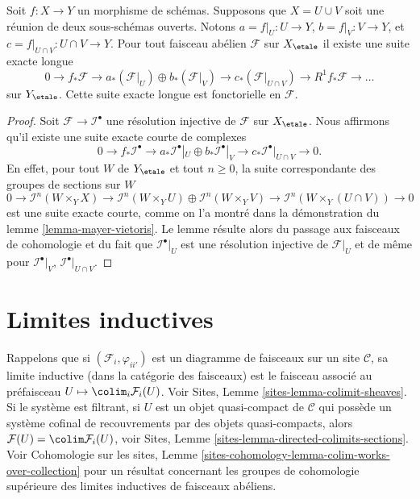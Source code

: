 \begin{lemma}
\label{lemma-relative-mayer-vietoris}
Soit $f : X \to Y$ un morphisme de sch\'emas. Supposons que $X = U \cup V$
soit une r\'eunion de deux sous-sch\'emas ouverts. Notons
$a = f|_U : U \to Y$, $b = f|_V : V \to Y$, et
$c = f|_{U \cap V} : U \cap V \to Y$.
Pour tout faisceau ab\'elien $\mathcal{F}$ sur $X_\etale$
il existe une suite exacte longue
$$
0 \to
f_*\mathcal{F} \to
a_*(\mathcal{F}|_U) \oplus b_*(\mathcal{F}|_V) \to
c_*(\mathcal{F}|_{U \cap V}) \to
R^1f_*\mathcal{F} \to \ldots
$$
sur $Y_\etale$.
Cette suite exacte longue est fonctorielle en $\mathcal{F}$.
\end{lemma}

\begin{proof}
Soit $\mathcal{F} \to \mathcal{I}^\bullet$ une r\'esolution injective
de $\mathcal{F}$ sur $X_\etale$. Nous affirmons qu'il existe
une suite exacte courte de complexes
$$
0 \to
f_*\mathcal{I}^\bullet \to
a_*\mathcal{I}^\bullet|_U \oplus b_*\mathcal{I}^\bullet|_V \to
c_*\mathcal{I}^\bullet|_{U \cap V} \to
0.
$$
En effet, pour tout $W$ de $Y_\etale$ et tout $n \geq 0$, la
suite correspondante des groupes de sections sur $W$
$$
0 \to
\mathcal{I}^n(W \times_Y X) \to
\mathcal{I}^n(W \times_Y U)
\oplus \mathcal{I}^n(W \times_Y V) \to
\mathcal{I}^n(W \times_Y (U \cap V)) \to
0
$$
est une suite exacte courte, comme on l'a montr\'e dans la d\'emonstration du lemme \ref{lemma-mayer-vietoris}.
Le lemme r\'esulte alors du passage aux faisceaux de cohomologie et du fait que
$\mathcal{I}^\bullet|_U$ est une r\'esolution injective de $\mathcal{F}|_U$
et de m\^eme pour $\mathcal{I}^\bullet|_V$, $\mathcal{I}^\bullet|_{U \cap V}$.
\end{proof}







\section{Limites inductives}
\label{section-colimit}

\noindent
Rappelons que si $(\mathcal{F}_i, \varphi_{ii'})$ est un diagramme de faisceaux sur
un site $\mathcal{C}$, sa limite inductive (dans la cat\'egorie des faisceaux) est le
faisceau associ\'e au pr\'efaisceau $U \mapsto \colim_i \mathcal{F}_i(U)$. Voir
Sites, Lemme \ref{sites-lemma-colimit-sheaves}.
Si le syst\`eme est filtrant, si $U$ est un objet quasi-compact de
$\mathcal{C}$ qui poss\`ede un syst\`eme cofinal de recouvrements par des objets
quasi-compacts, alors $\mathcal{F}(U) = \colim \mathcal{F}_i(U)$, voir
Sites, Lemme \ref{sites-lemma-directed-colimits-sections}.
Voir Cohomologie sur les sites, Lemme
\ref{sites-cohomology-lemma-colim-works-over-collection}
pour un r\'esultat concernant les groupes de cohomologie sup\'erieure des limites inductives
de faisceaux ab\'eliens.

